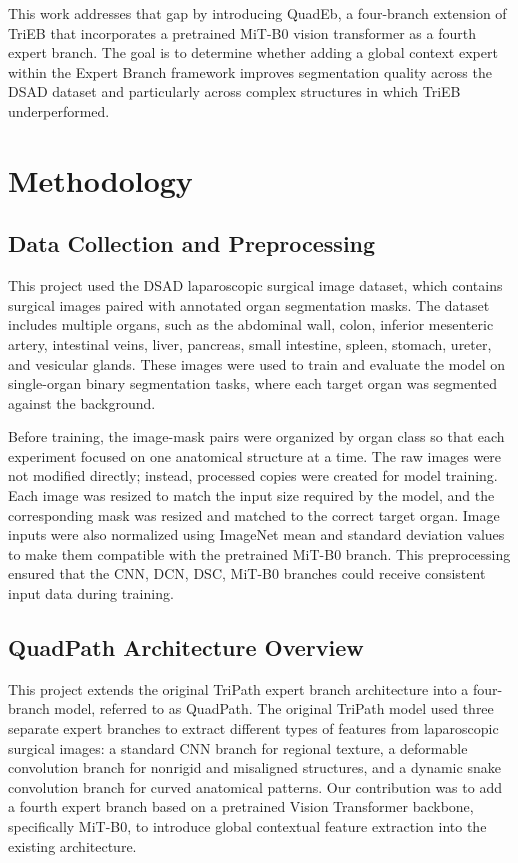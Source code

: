 \documentclass[twocolumn]{article}
\begin{document}
This work addresses that gap by introducing QuadEb, a four-branch extension of TriEB that incorporates a pretrained MiT-B0 vision transformer as a fourth expert branch. The goal is to determine whether adding a global context expert within the Expert Branch framework improves segmentation quality across the DSAD dataset and particularly across complex structures in which TriEB underperformed. 

\section{Methodology}

\subsection{Data Collection and Preprocessing }

This project used the DSAD laparoscopic surgical image dataset, which contains surgical images paired with annotated organ segmentation masks. The dataset includes multiple organs, such as the abdominal wall, colon, inferior mesenteric artery, intestinal veins, liver, pancreas, small intestine, spleen, stomach, ureter, and vesicular glands. These images were used to train and evaluate the model on single-organ binary segmentation tasks, where each target organ was segmented against the background.

Before training, the image-mask pairs were organized by organ class so that each experiment focused on one anatomical structure at a time. The raw images were not modified directly; instead, processed copies were created for model training. Each image was resized to match the input size required by the model, and the corresponding mask was resized and matched to the correct target organ. Image inputs were also normalized using ImageNet mean and standard deviation values to make them compatible with the pretrained MiT-B0 branch. This preprocessing ensured that the CNN, DCN, DSC, MiT-B0 branches could receive consistent input data during training.

\subsection{QuadPath Architecture Overview }

This project extends the original TriPath expert branch architecture into a four-branch model, referred to as QuadPath. The original TriPath model used three separate expert branches to extract different types of features from laparoscopic surgical images: a standard CNN branch for regional texture, a deformable convolution branch for nonrigid and misaligned structures, and a dynamic snake convolution branch for curved anatomical patterns. Our contribution was to add a fourth expert branch based on a pretrained Vision Transformer backbone, specifically MiT-B0, to introduce global contextual feature extraction into the existing architecture.
\end{document}
